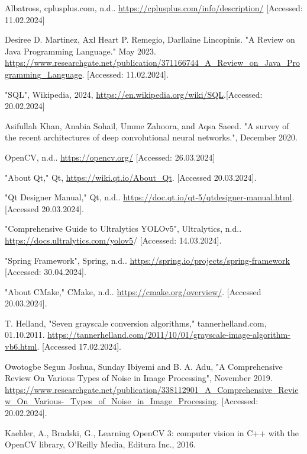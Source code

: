 \documentclass[12pt]{article}
\begin{document}
\begin{thebibliography}{9}

Albatross, cplusplus.com, n.d.. \url{https://cplusplus.com/info/description/} [Accessed: 11.02.2024]

Desiree D. Martinez, Axl Heart P. Remegio, Darllaine Lincopinis. 
"A Review on Java Programming Language." May 2023. \url{https://www.researchgate.net/publication/371166744\_A\_Review\_on\_Java\_Programming\_Language}. [Accessed: 11.02.2024].

"SQL", Wikipedia, 2024, \url{https://en.wikipedia.org/wiki/SQL}.[Accessed: 20.02.2024]

Asifullah Khan, Anabia Sohail, Umme Zahoora, and Aqsa Saeed. "A survey of the recent architectures of deep convolutional neural networks.", December 2020.

OpenCV, n.d.. \url{https://opencv.org/} [Accessed: 26.03.2024]

"About Qt," Qt, \url{https://wiki.qt.io/About\_Qt}. [Accessed 20.03.2024].

"Qt Designer Manual," Qt, n.d.. \url{https://doc.qt.io/qt-5/qtdesigner-manual.html}. [Accessed 20.03.2024].

"Comprehensive Guide to Ultralytics YOLOv5", Ultralytics, n.d.. \url{https://docs.ultralytics.com/yolov5}/ [Accessed: 14.03.2024].

"Spring Framework", Spring, n.d.. \url{https://spring.io/projects/spring-framework} [Accessed: 30.04.2024].

"About CMake," CMake, n.d.. \url{https://cmake.org/overview/}. [Accessed 20.03.2024].

T. Helland, "Seven grayscale conversion algorithms," tannerhelland.com, 01.10.2011. \url{https://tannerhelland.com/2011/10/01/grayscale-image-algorithm-vb6.html}. [Accessed 17.02.2024].

Owotogbe Segun Joshua, Sunday Ibiyemi and B. A. Adu, "A Comprehensive Review On Various Types of Noise in Image Processing", November 2019. \url{https://www.researchgate.net/publication/338112901\_A\_Comprehensive\_Review\_On\_Various-\_Types\_of\_Noise\_in\_Image\_Processing}. [Accessed: 20.02.2024].

Kaehler, A., Bradski, G., Learning OpenCV 3: computer vision in C++ with the OpenCV library, O'Reilly Media, Editura Inc., 2016.


\end{thebibliography}
\end{document}
